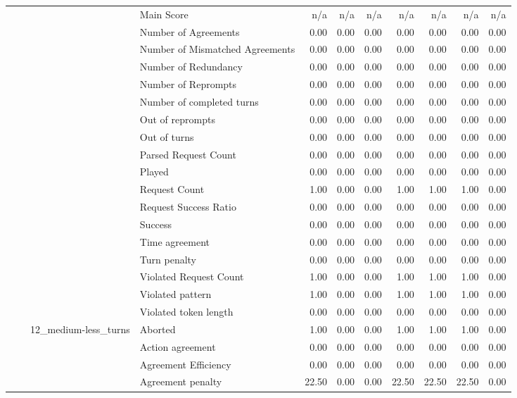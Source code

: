 \begin{tabular}{llllrrrrrrr}
 &  &  & Main Score & n/a & n/a & n/a & n/a & n/a & n/a & n/a \\
 &  &  & Number of Agreements & 0.00 & 0.00 & 0.00 & 0.00 & 0.00 & 0.00 & 0.00 \\
 &  &  & Number of Mismatched Agreements & 0.00 & 0.00 & 0.00 & 0.00 & 0.00 & 0.00 & 0.00 \\
 &  &  & Number of Redundancy & 0.00 & 0.00 & 0.00 & 0.00 & 0.00 & 0.00 & 0.00 \\
 &  &  & Number of Reprompts & 0.00 & 0.00 & 0.00 & 0.00 & 0.00 & 0.00 & 0.00 \\
 &  &  & Number of completed turns & 0.00 & 0.00 & 0.00 & 0.00 & 0.00 & 0.00 & 0.00 \\
 &  &  & Out of reprompts & 0.00 & 0.00 & 0.00 & 0.00 & 0.00 & 0.00 & 0.00 \\
 &  &  & Out of turns & 0.00 & 0.00 & 0.00 & 0.00 & 0.00 & 0.00 & 0.00 \\
 &  &  & Parsed Request Count & 0.00 & 0.00 & 0.00 & 0.00 & 0.00 & 0.00 & 0.00 \\
 &  &  & Played & 0.00 & 0.00 & 0.00 & 0.00 & 0.00 & 0.00 & 0.00 \\
 &  &  & Request Count & 1.00 & 0.00 & 0.00 & 1.00 & 1.00 & 1.00 & 0.00 \\
 &  &  & Request Success Ratio & 0.00 & 0.00 & 0.00 & 0.00 & 0.00 & 0.00 & 0.00 \\
 &  &  & Success & 0.00 & 0.00 & 0.00 & 0.00 & 0.00 & 0.00 & 0.00 \\
 &  &  & Time agreement & 0.00 & 0.00 & 0.00 & 0.00 & 0.00 & 0.00 & 0.00 \\
 &  &  & Turn penalty & 0.00 & 0.00 & 0.00 & 0.00 & 0.00 & 0.00 & 0.00 \\
 &  &  & Violated Request Count & 1.00 & 0.00 & 0.00 & 1.00 & 1.00 & 1.00 & 0.00 \\
 &  &  & Violated pattern & 1.00 & 0.00 & 0.00 & 1.00 & 1.00 & 1.00 & 0.00 \\
 &  &  & Violated token length & 0.00 & 0.00 & 0.00 & 0.00 & 0.00 & 0.00 & 0.00 \\
\cline{3-11}
 &  & \multirow[t]{27}{*}{12_medium-less_turns} & Aborted & 1.00 & 0.00 & 0.00 & 1.00 & 1.00 & 1.00 & 0.00 \\
 &  &  & Action agreement & 0.00 & 0.00 & 0.00 & 0.00 & 0.00 & 0.00 & 0.00 \\
 &  &  & Agreement Efficiency & 0.00 & 0.00 & 0.00 & 0.00 & 0.00 & 0.00 & 0.00 \\
 &  &  & Agreement penalty & 22.50 & 0.00 & 0.00 & 22.50 & 22.50 & 22.50 & 0.00 \\

\end{tabular}
